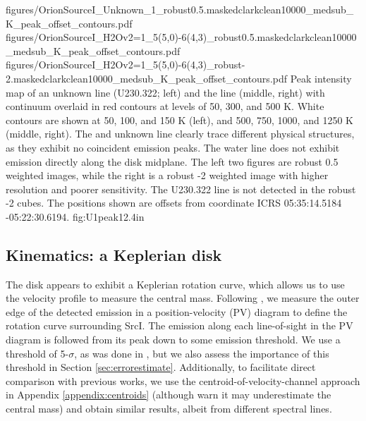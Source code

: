 \documentclass[twocolumn]{aastex62}
\newcommand{\sourcei}{SrcI\xspace}
\begin{document}
\FigureThree
{{figures/OrionSourceI_Unknown_1_robust0.5.maskedclarkclean10000_medsub_K_peak_offset_contours}.pdf}
{{figures/OrionSourceI_H2Ov2=1_5(5,0)-6(4,3)_robust0.5.maskedclarkclean10000_medsub_K_peak_offset_contours}.pdf}
{{figures/OrionSourceI_H2Ov2=1_5(5,0)-6(4,3)_robust-2.maskedclarkclean10000_medsub_K_peak_offset_contours}.pdf}
{Peak intensity map of an unknown line (U230.322; left) and the \water
line (middle, right) with continuum overlaid
in red contours at levels of 
50,  300, and 500 K. %
White contours are shown at 50, 100, and 150 K (left), and  500, 750, 1000, and 1250 K
(middle, right).
The \water and unknown line clearly trace different physical structures, as
they exhibit no coincident emission peaks.  The water line does
not exhibit emission directly along the disk midplane.
The left two figures are robust 0.5 weighted images, while the right
is a robust -2 weighted image with higher resolution and poorer
sensitivity.  The U230.322 line is not detected in the robust -2 cubes.
The positions shown are offsets from coordinate ICRS 05:35:14.5184 -05:22:30.6194.
}
{fig:U1peak}{1}{2.4in}


\subsection{Kinematics: a Keplerian disk}
\label{sec:kinematics}
The disk appears to exhibit a Keplerian rotation curve, which allows us to use
the velocity profile to measure the central mass.
Following \citet{Seifried2016a}, we measure the outer edge of the detected
emission in a position-velocity (PV) diagram to define the rotation curve
surrounding \sourcei. 
The emission along each line-of-sight
in the PV diagram is followed from
its peak down to some emission threshold.
We use a threshold of 5-$\sigma$, as was done in \citet{Seifried2016a}, but we
also assess the importance of this threshold in Section
\ref{sec:errorestimate}.
Additionally, to facilitate direct comparison with
previous works, we use the centroid-of-velocity-channel approach
in Appendix \ref{appendix:centroids} (although 
\citet{Seifried2016a} warn it may underestimate the central mass)
and obtain similar results, albeit from different spectral lines.
\end{document}
